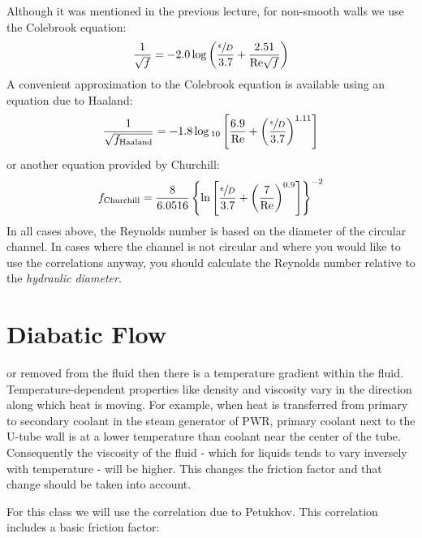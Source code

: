 Although it was mentioned in the previous lecture, for non-smooth walls we use the Colebrook equation:
$$\frac{1}{\sqrt{f}} = -2.0\log{\left(\frac{\sfrac{\epsilon}{D}}{3.7} + \frac{2.51}{\text{Re}\sqrt{f}}\right)}$$
A convenient approximation to the Colebrook equation is available using an equation due to Haaland\cite{haaland1983simple}:
$$ \frac{1}{\sqrt{f_{\text{Haaland}}}}=-1.8 \log{_{10}\left[\frac{6.9}{\text{Re}}+\left(\frac{\sfrac{\epsilon}{D}}{3.7} \right)^{1.11} \right]}$$
or another equation provided by Churchill\cite{churchill1973empirical}:
$$f_{\text{Churchill}}= \frac{8}{6.0516}\left\{\ln{\left[\frac{\sfrac{\epsilon}{D}}{3.7}+\left(\frac{7}{\text{Re}} \right)^{0.9} \right]} \right\}^{-2}$$
In all cases above, the Reynolds number is based on the diameter of the circular channel.  In cases where the channel is not circular and where you would like to use the correlations anyway, you should calculate the Reynolds number relative to the \emph{hydraulic diameter}. 

\section{Diabatic Flow}
 or removed from the fluid then there is a temperature gradient within the fluid.  Temperature-dependent properties like density and viscosity vary in the direction along which heat is moving.  For example, when heat is transferred from primary to secondary coolant in the steam generator of PWR, primary coolant next to the U-tube wall is at a lower temperature than coolant near the center of the tube.  Consequently the viscosity of the fluid - which for liquids tends to vary inversely with temperature - will be higher.  This changes the friction factor and that change should be taken into account.

For this class we will use the correlation due to Petukhov\cite{petukhov1970heat}. This correlation includes a basic friction factor: 

